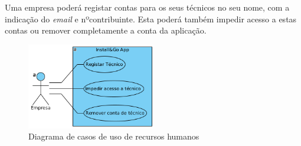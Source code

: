 Uma empresa poderá registar contas para os seus técnicos no seu nome, com a indicação do \textit{email} e nºcontribuinte. Esta poderá também impedir acesso a estas contas ou remover completamente a conta da aplicação.

\begin{figure}[htb]
    \centering
    \includegraphics[width=0.5\textwidth]{images/diagramas/casos_de_uso/use_case_rec_humanos.png}
    \caption{Diagrama de casos de uso de recursos humanos}
    \label{fig:19}
\end{figure}